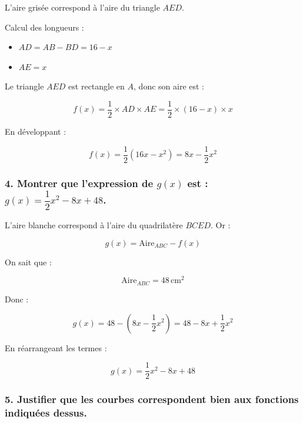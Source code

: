 \documentclass[a4paper,11pt]{article}
\begin{document}
L'aire grisée correspond à l'aire du triangle $AED$.

Calcul des longueurs :

\begin{itemize}
    \item $AD = AB - BD = 16 - x$
    \item $AE = x$
\end{itemize}

Le triangle $AED$ est rectangle en $A$, donc son aire est :

\[
f(x) = \dfrac{1}{2} \times AD \times AE = \dfrac{1}{2} \times (16 - x) \times x
\]

En développant :

\[
f(x) = \dfrac{1}{2} (16x - x^2) = 8x - \dfrac{1}{2} x^2
\]


\bigskip

\subsubsection*{4. Montrer que l'expression de $g(x)$ est : $g(x) = \dfrac{1}{2} x^2 - 8x + 48$.}

L'aire blanche correspond à l'aire du quadrilatère $BCED$. Or :

\[
g(x) = \text{Aire}_{ABC} - f(x)
\]

On sait que :

\[
\text{Aire}_{ABC} = 48\,\text{cm}^2
\]

Donc :

\[
g(x) = 48 - \left(8x - \dfrac{1}{2} x^2\right) = 48 - 8x + \dfrac{1}{2} x^2
\]

En réarrangeant les termes :

\[
g(x) = \dfrac{1}{2} x^2 - 8x + 48
\]


\bigskip

\subsubsection*{5. Justifier que les courbes correspondent bien aux fonctions indiquées dessus.}

%
\end{document}
